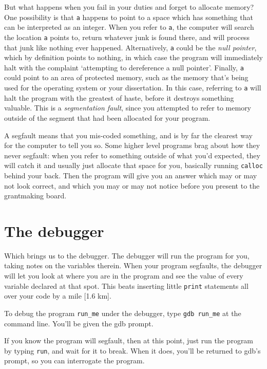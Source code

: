 \documentclass[12pt]{article}
\begin{document}
But what happens when you fail in your duties and forget to allocate
memory? One possibility is that {\tt a} happens to point to a space
which has something that can be interpreted as an integer. When you refer
to {\tt *a}, the computer will search the location {\tt a}
points to, return whatever junk is found there, and will process that
junk like nothing ever happened. Alternatively, {\tt a} could be the
{\sl null pointer},  which by definition points to nothing, in which
case the program will immediately halt with the complaint `attempting to
dereference a null pointer'. Finally, {\tt a} could point to an area of
protected memory, such as the memory that's being used for the operating
system or your dissertation. In this case, referring to {\tt *a} will
halt the program with the greatest of haste, before it destroys something
valuable. This is a {\sl segmentation fault}, since you attempted to refer
to memory outside of the segment that had been allocated for your program.

A segfault means that you mis-coded something, and 
is by far the clearest way for the computer to tell you so. Some higher level
programs brag about how they never segfault: when you refer to something
outside of what you'd expected, they will catch it and usually just
allocate that space for you, basically running {\tt calloc} behind your
back. Then the program will give you an answer which may or may not look
correct, and which you may or may not notice before you present to the
grantmaking board. 

\section{The debugger}   \label{debug}
Which brings us to the debugger. The debugger will run the program for
you, taking notes on the variables therein. When your program segfaults,
the debugger will let you look at where you
are in the program and see the value of every variable declared at that
spot. This beats inserting little {\tt print} statements all over your
code by a mile [1.6 km].

To debug the program {\tt run\_me} under the debugger, type {\tt gdb
run\_me} at the command line.  You'll be given the gdb prompt.

If you know the program will segfault, then at this point, just run the program
by typing {\tt run}, and wait for it to break. When it does, you'll be
returned to gdb's prompt, so you can interrogate the program.
\end{document}
